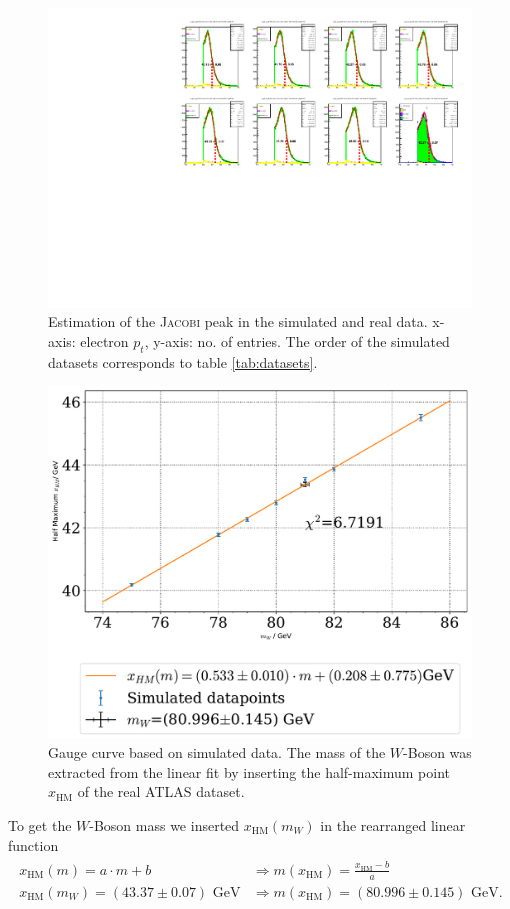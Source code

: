 \documentclass[11pt,a4paper,notitlepage]{scrartcl}
\begin{document}
\begin{figure}[H]
	\centering
	\includegraphics[width=.85\linewidth]{P1_pics/gauge/gauge_curve.pdf}
	\caption{Estimation of the \textsc{Jacobi} peak in the simulated and real data. x-axis: electron $p_t$, y-axis: no. of entries. The order of the simulated datasets corresponds to table \ref{tab:datasets}.}
	\label{fig:gauge_orig}
\end{figure}
\begin{figure}[H]
	\centering
	\includegraphics[width=0.65\linewidth]{P1_pics/gauge_results/gauge.pdf}
	\caption{Gauge curve based on simulated data. The mass of the $W$-Boson was extracted from the linear fit by inserting the half-maximum point $x_{\text{HM}}$ of the real ATLAS dataset.}\label{fig:gauge}
\end{figure}







To get the $W$-Boson mass we inserted $x_{\text{HM}}(m_W)$ in the rearranged linear function
\begin{align}\label{eq:m_w_result}
	\begin{split}
			x_{\text{HM}}(m)=a\cdot m+b &\Rightarrow m(x_{\text{HM}})=\frac{x_\text{HM}-b}{a}\\
			x_{\text{HM}}(m_W)=(43.37\pm0.07)\text{ GeV} &\Rightarrow m(x_{\text{HM}})=(80.996\pm0.145)\text{ GeV}.
	\end{split}
\end{align}
\end{document}
